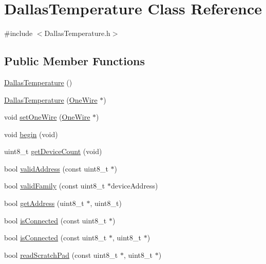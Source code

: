 \hypertarget{class_dallas_temperature}{}\section{Dallas\+Temperature Class Reference}
\label{class_dallas_temperature}


{\ttfamily \#include $<$Dallas\+Temperature.\+h$>$}

\subsection*{Public Member Functions}
\begin{DoxyCompactItemize}
\item 
\hyperlink{class_dallas_temperature_af46e868b6702ff5f77263985cd990e01}{Dallas\+Temperature} ()
\item 
\hyperlink{class_dallas_temperature_a37139ebd1a6122e232800528aee8cb2b}{Dallas\+Temperature} (\hyperlink{class_one_wire}{One\+Wire} $\ast$)
\item 
void \hyperlink{class_dallas_temperature_af985bf5f9ed6857424e8a9532eaf5e2f}{set\+One\+Wire} (\hyperlink{class_one_wire}{One\+Wire} $\ast$)
\item 
void \hyperlink{class_dallas_temperature_aea297b5f2a720a5455245c0fbf7333ec}{begin} (void)
\item 
uint8\+\_\+t \hyperlink{class_dallas_temperature_a8bf92c0b6b8c3167daca4c2046ade13a}{get\+Device\+Count} (void)
\item 
bool \hyperlink{class_dallas_temperature_a71e4744b8d7b2f1c05a96cd158c83007}{valid\+Address} (const uint8\+\_\+t $\ast$)
\item 
bool \hyperlink{class_dallas_temperature_a3f3678c8defd473e8eebd9cfe793b329}{valid\+Family} (const uint8\+\_\+t $\ast$device\+Address)
\item 
bool \hyperlink{class_dallas_temperature_afa644bebf50c81b6641a31c585b62538}{get\+Address} (uint8\+\_\+t $\ast$, uint8\+\_\+t)
\item 
bool \hyperlink{class_dallas_temperature_a19afa5e594de0ab6caa5a48a70650927}{is\+Connected} (const uint8\+\_\+t $\ast$)
\item 
bool \hyperlink{class_dallas_temperature_a624f64b186c13927d4f74bd7c5b92c2e}{is\+Connected} (const uint8\+\_\+t $\ast$, uint8\+\_\+t $\ast$)
\item 
bool \hyperlink{class_dallas_temperature_a2b55774207d0211fd679247a7137142b}{read\+Scratch\+Pad} (const uint8\+\_\+t $\ast$, uint8\+\_\+t $\ast$)

\end{DoxyCompactItemize}
